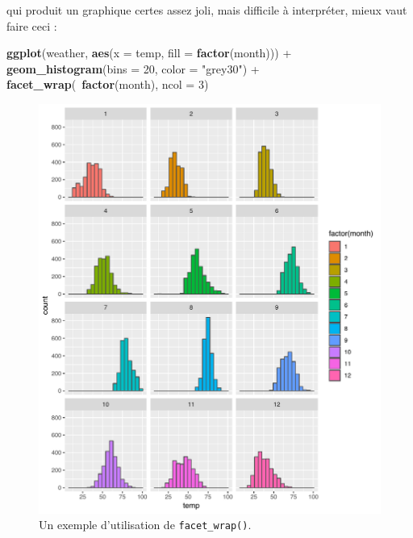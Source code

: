 \documentclass[a4paperpaper,]{article}
\newenvironment{Shaded}{\begin{snugshade}}{\end{snugshade}}
\newcommand{\DataTypeTok}[1]{\textcolor[rgb]{0.00,0.34,0.68}{#1}}
\newcommand{\DecValTok}[1]{\textcolor[rgb]{0.69,0.50,0.00}{#1}}
\newcommand{\KeywordTok}[1]{\textcolor[rgb]{0.12,0.11,0.11}{\textbf{#1}}}
\newcommand{\NormalTok}[1]{\textcolor[rgb]{0.12,0.11,0.11}{#1}}
\newcommand{\OperatorTok}[1]{\textcolor[rgb]{0.12,0.11,0.11}{#1}}
\newcommand{\StringTok}[1]{\textcolor[rgb]{0.75,0.01,0.01}{#1}}
\begin{document}
qui produit un graphique certes assez joli, mais difficile à interpréter, mieux vaut faire ceci :

\begin{Shaded}
\begin{Highlighting}[]
\KeywordTok{ggplot}\NormalTok{(weather, }\KeywordTok{aes}\NormalTok{(}\DataTypeTok{x =}\NormalTok{ temp, }\DataTypeTok{fill =} \KeywordTok{factor}\NormalTok{(month))) }\OperatorTok{+}
\StringTok{  }\KeywordTok{geom_histogram}\NormalTok{(}\DataTypeTok{bins =} \DecValTok{20}\NormalTok{, }\DataTypeTok{color =} \StringTok{"grey30"}\NormalTok{) }\OperatorTok{+}
\StringTok{  }\KeywordTok{facet_wrap}\NormalTok{(}\OperatorTok{~}\KeywordTok{factor}\NormalTok{(month), }\DataTypeTok{ncol =} \DecValTok{3}\NormalTok{)}
\end{Highlighting}
\end{Shaded}

\begin{figure}[htpb]

{\centering \includegraphics[width=0.9\linewidth]{figure/wrap-1} 

}

\caption{Un exemple d'utilisation de \texttt{facet\_wrap()}.}\label{fig:wrap}
\end{figure}
\end{document}
